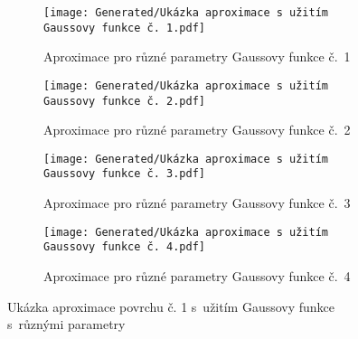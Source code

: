 \begin{landscapeimagepage}
    \vspace*{\fill}
    \begin{figure}[H]
        \centering
        \begin{subfigure}{.5\textheight}
            \centering
            \texttt{[image: Generated/Ukázka aproximace s užitím Gaussovy funkce č. 1.pdf]}
            \caption{Aproximace pro různé parametry Gaussovy funkce č.~1}
            \label{fig:Ukázka aproximace povrchu s~užitím Gaussovy funkce č. 1}
        \end{subfigure}
        \vspace{0.5cm}
        \hspace{2.5cm}
        \begin{subfigure}{.5\textheight}
            \centering
            \texttt{[image: Generated/Ukázka aproximace s užitím Gaussovy funkce č. 2.pdf]}
            \caption{Aproximace pro různé parametry Gaussovy funkce č.~2}
            \label{fig:Ukázka aproximace povrchu s~užitím Gaussovy funkce č. 2}
        \end{subfigure}
        \vspace{0.5cm}
        \begin{subfigure}{.5\textheight}
            \centering
            \texttt{[image: Generated/Ukázka aproximace s užitím Gaussovy funkce č. 3.pdf]}
            \caption{Aproximace pro různé parametry Gaussovy funkce č.~3}
            \label{fig:Ukázka aproximace povrchu s~užitím Gaussovy funkce č. 3}
        \end{subfigure}
        \hspace{2.5cm}
        \begin{subfigure}{.5\textheight}
            \centering
            \texttt{[image: Generated/Ukázka aproximace s užitím Gaussovy funkce č. 4.pdf]}
            \caption{Aproximace pro různé parametry Gaussovy funkce č.~4}
            \label{fig:Ukázka aproximace povrchu s~užitím Gaussovy funkce č. 4}
        \end{subfigure}
        \caption{Ukázka aproximace povrchu č. 1 s~užitím Gaussovy funkce s~různými parametry}
        \label{fig:Ukázka aproximace povrchu č. 1 s~užitím Gaussovy funkce s~různými parametry}
    \end{figure}
    \vspace*{\fill}
\end{landscapeimagepage}

